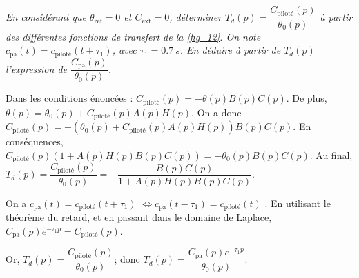 \subparagraph{\label{q_24}}\textit{En considérant que  $\theta_{\text{ref}}=0$ et  $C_{\text{ext}}=0$, déterminer $T_d(p)=\dfrac{C_{\text{piloté}}(p)}{\theta_0(p)}$ à partir des différentes fonctions de transfert de la \autoref{fig_12}. On note $c_{\text{pa}}(t)=c_{\text{piloté}}(t+\tau_1)$, avec $\tau_1 = \SI{0,7}{s}$. En déduire à partir de $T_d(p)$ l'expression de $\dfrac{C_{\text{pa}}(p)}{\theta_0(p)}$.} %
\ifprof
\begin{corrige}
Dans les conditions énoncées : $C_{\text{piloté}}(p)=-\theta(p) B(p) C(p)$. De plus,$\theta(p)=\theta_0(p)+C_{\text{piloté}}(p) A(p) H(p)$. 
On a donc $C_{\text{piloté}}(p)=-\left( \theta_0(p)+C_{\text{piloté}}(p) A(p) H(p) \right) B(p) C(p)$.
En conséquences, $C_{\text{piloté}}(p)\left( 1+ A(p) H(p) B(p) C(p) \right)=- \theta_0(p) B(p) C(p)$.
Au final, $T_d(p)=\dfrac{C_{\text{piloté}}(p)}{\theta_0(p)} = -\dfrac{ B(p) C(p)}{ 1+ A(p) H(p) B(p) C(p)}$.


 On a $c_{\text{pa}}(t)=c_{\text{piloté}}(t+\tau_1)$ $\Leftrightarrow c_{\text{pa}}(t-\tau_1)=c_{\text{piloté}}(t) $ . En utilisant le théorème du retard, et en passant dans le domaine de Laplace, 
  $C_{\text{pa}}(p)e^{-\tau_1 p} =C_{\text{piloté}}(p)$. 
  
Or, $T_d(p)=\dfrac{C_{\text{piloté}}(p)}{\theta_0(p)}$; donc $T_d(p)=\dfrac{C_{\text{pa}}(p)e^{-\tau_1 p}}{\theta_0(p)}$.


\end{corrige}
\else
\fi

